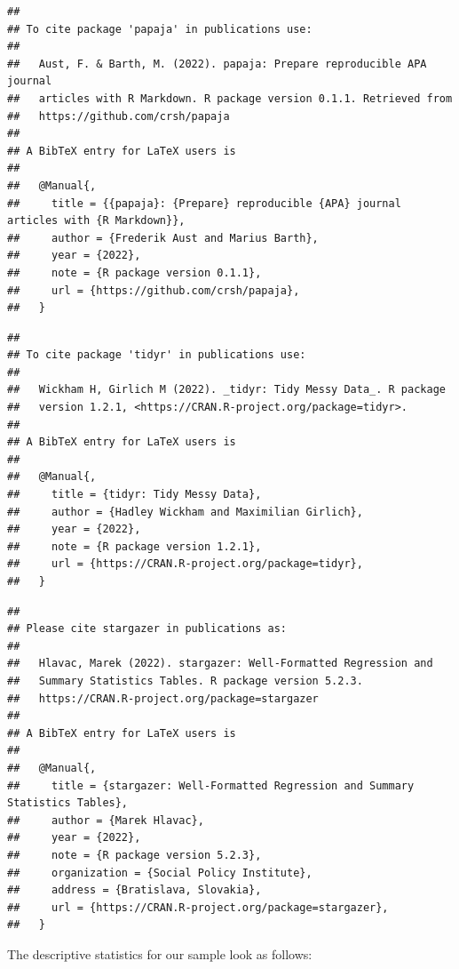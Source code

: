 \documentclass[
  man,floatsintext]{apa6}
\begin{document}
\begin{verbatim}
## 
## To cite package 'papaja' in publications use:
## 
##   Aust, F. & Barth, M. (2022). papaja: Prepare reproducible APA journal
##   articles with R Markdown. R package version 0.1.1. Retrieved from
##   https://github.com/crsh/papaja
## 
## A BibTeX entry for LaTeX users is
## 
##   @Manual{,
##     title = {{papaja}: {Prepare} reproducible {APA} journal articles with {R Markdown}},
##     author = {Frederik Aust and Marius Barth},
##     year = {2022},
##     note = {R package version 0.1.1},
##     url = {https://github.com/crsh/papaja},
##   }
\end{verbatim}

\begin{verbatim}
## 
## To cite package 'tidyr' in publications use:
## 
##   Wickham H, Girlich M (2022). _tidyr: Tidy Messy Data_. R package
##   version 1.2.1, <https://CRAN.R-project.org/package=tidyr>.
## 
## A BibTeX entry for LaTeX users is
## 
##   @Manual{,
##     title = {tidyr: Tidy Messy Data},
##     author = {Hadley Wickham and Maximilian Girlich},
##     year = {2022},
##     note = {R package version 1.2.1},
##     url = {https://CRAN.R-project.org/package=tidyr},
##   }
\end{verbatim}

\begin{verbatim}
## 
## Please cite stargazer in publications as:
## 
##   Hlavac, Marek (2022). stargazer: Well-Formatted Regression and
##   Summary Statistics Tables. R package version 5.2.3.
##   https://CRAN.R-project.org/package=stargazer
## 
## A BibTeX entry for LaTeX users is
## 
##   @Manual{,
##     title = {stargazer: Well-Formatted Regression and Summary Statistics Tables},
##     author = {Marek Hlavac},
##     year = {2022},
##     note = {R package version 5.2.3},
##     organization = {Social Policy Institute},
##     address = {Bratislava, Slovakia},
##     url = {https://CRAN.R-project.org/package=stargazer},
##   }
\end{verbatim}

The descriptive statistics for our sample look as follows:
\end{document}
